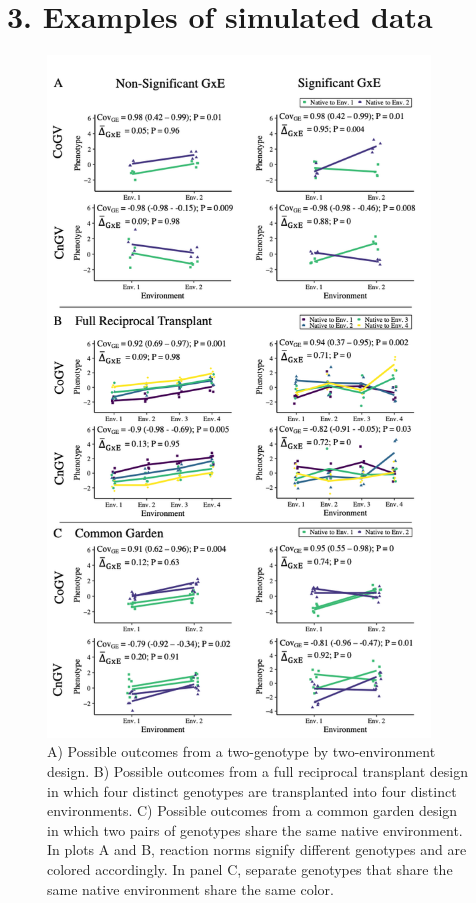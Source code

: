 \documentclass[11pt, oneside]{amsart}
\begin{document}
\section{3. Examples of simulated data}
\renewcommand\thefigure{S3}
\begin{figure}[h]
\begin{center}
\includegraphics[width=4in]{Figs/3.23.PhenotypePanel.png}
\end{center}
\label{Fig: Examples of simulated data}
\caption[Simulated scenarios showing cogradient variation and countergradient variation in situations with non-significant and significant G×E.]{A) Possible outcomes from a two-genotype by two-environment design. B) Possible outcomes from a full reciprocal transplant design in which four distinct genotypes are transplanted into four distinct environments. C) Possible outcomes from a common garden design in which two pairs of genotypes share the same native environment. In plots A and B, reaction norms signify different genotypes and are colored accordingly. In panel C, separate genotypes that share the same native environment share the same color.  }
\end{figure}
\end{document}
